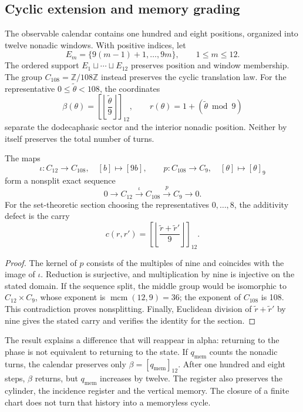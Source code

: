 

\subsection{Cyclic extension and memory grading}
\label{x_reciprocidad:subsec:k-calendario}

The observable calendar contains one hundred and eight positions, organized into
twelve nonadic windows. With positive indices, let
\[
 E_m=\{9(m-1)+1,\ldots,9m\},\qquad 1\leq m\leq12.
\]
The ordered support \(E_1\sqcup\cdots\sqcup E_{12}\) preserves position and
window membership. The group \(C_{108}=\mathbb Z/108\mathbb Z\)
instead preserves the cyclic translation law. For the representative
\(0\leq\widetilde\theta<108\), the coordinates
\[
 \beta(\theta)=\left[\left\lfloor\frac{\widetilde\theta}{9}\right\rfloor\right]_{12},
 \qquad r(\theta)=1+(\widetilde\theta\bmod9)
\]
separate the dodecaphasic sector and the interior nonadic position. Neither
by itself preserves the total number of turns.

\begin{proposition}
\label{x_reciprocidad:prop:k-extension}
The maps
\[
 \iota:C_{12}\longrightarrow C_{108},\quad[b]\longmapsto[9b],
 \qquad p:C_{108}\longrightarrow C_9,\quad[\theta]\longmapsto[\theta]_9
\]
form a nonsplit exact sequence
\[
 0\longrightarrow C_{12}\xrightarrow{\iota}C_{108}
 \xrightarrow{p}C_9\longrightarrow0.
\]
For the set-theoretic section choosing the representatives
\(0,\ldots,8\), the additivity defect is the carry
\[
 c(r,r')=\left[\left\lfloor\frac{\widetilde r+\widetilde r'}9\right\rfloor\right]_{12}.
\]
\end{proposition}

\begin{proof}
The kernel of \(p\) consists of the multiples of nine and coincides with
the image of \(\iota\). Reduction is surjective, and multiplication
by nine is injective on the stated domain. If the sequence
split, the middle group would be isomorphic to \(C_{12}\times C_9\), whose
exponent is \(\operatorname{mcm}(12,9)=36\); the exponent of
\(C_{108}\) is 108. This contradiction proves nonsplitting. Finally,
Euclidean division of \(\widetilde r+\widetilde r'\) by nine gives the
stated carry and verifies the identity for the section.
\end{proof}

The result explains a difference that will reappear in alpha: returning to the
phase is not equivalent to returning to the state. If \(q_{\mathrm{mem}}\) counts the
nonadic turns, the calendar preserves only
\(\beta=[q_{\mathrm{mem}}]_{12}\). After one hundred and eight steps,
\(\beta\) returns, but \(q_{\mathrm{mem}}\) increases by twelve. The
register also preserves the cylinder, the incidence register and the vertical
memory. The closure of a finite chart does not turn that history into a
memoryless cycle.

